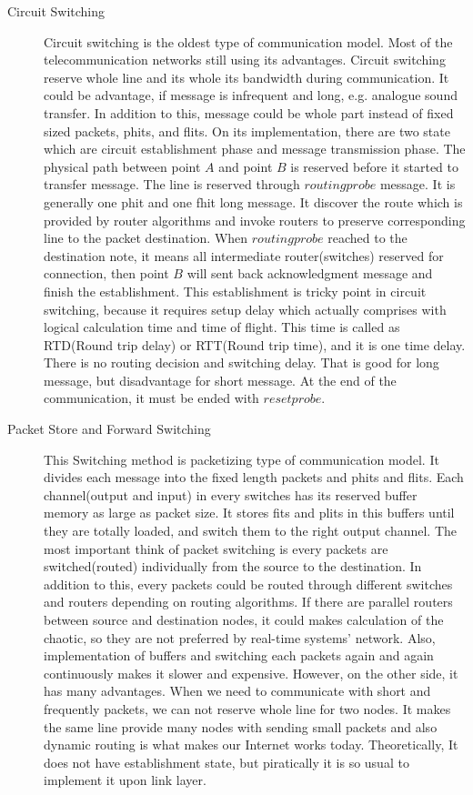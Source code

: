         \begin{description}
            \item[Circuit Switching] Circuit switching is the oldest type of communication model. Most of the telecommunication networks still using its advantages. Circuit switching reserve whole line and its whole its bandwidth during communication. It could be advantage, if message is infrequent and long, e.g. analogue sound transfer. In addition to this, message could be whole part instead of fixed sized packets, phits, and flits. On its implementation, there are two state which are circuit establishment phase and message transmission phase\cite{0122007514}. The physical path between point $A$ and point $B$ is reserved before it started to transfer message. The line is reserved through $routing probe$ message. It is generally one phit and one fhit long message. It discover the route which is provided by router algorithms and invoke routers to preserve corresponding line to the packet destination. When $routing probe$ reached to the destination note, it means all intermediate router(switches) reserved for connection, then point $B$ will sent back acknowledgment message and finish the establishment. This establishment is tricky point in circuit switching, because it requires setup delay which actually comprises with logical calculation time and time of flight. This time is called as RTD(Round trip delay) or RTT(Round trip time), and it is one time delay. There is no routing decision and switching delay. That is good for long message, but disadvantage for short message. At the end of the communication, it must be ended with $reset probe$.
            \item[Packet Store and Forward Switching] This Switching method is packetizing type of communication model. It divides each message into the fixed length packets and phits and flits. Each channel(output and input) in every switches has its reserved buffer memory as large as packet size. It stores fits and plits in this buffers until they are totally loaded, and switch them to the right output channel. The most important think of packet switching is every packets are switched(routed) individually from the source to the destination. In addition to this, every packets could be routed through different switches and routers depending on routing algorithms. If there are parallel routers between source and destination nodes, it could makes calculation of the chaotic, so they are not preferred by real-time systems' network. Also, implementation of buffers and switching each packets again and again continuously makes it slower and expensive. However, on the other side, it has many advantages. When we need to communicate with short and frequently packets, we can not reserve whole line for two nodes. It makes the same line provide many nodes with sending small packets and also dynamic routing is what makes our Internet works today. Theoretically, It does not have establishment state, but piratically it is so usual to implement it upon link layer.

\end{description}
